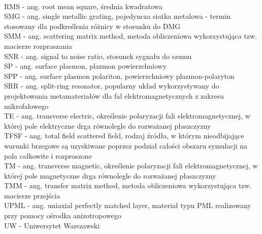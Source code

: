 \\RMS - ang. root mean square, średnia kwadratowa
\\SMG - ang. single metallic grating, pojedyncza siatka metalowa - termin stosowany dla podkreślenia różnicy w stosunku do DMG
\\SMM - ang. scattering matrix method, metoda obliczeniowa wykorzystująca tzw. macierze rozpraszania
\\SNR - ang. signal to noise ratio, stosunek sygnału do szumu
\\SP - ang. surface plasmon, plazmon powierzchniowy
\\SPP - ang. surface plasmon polariton, powierzchniowy plazmon-polaryton
\\SRR - ang. split-ring resonator, popularny układ wykorzystywany do projektowania metamateriałów dla fal elektromagnetycznych z zakresu mikrofalowego
\\TE - ang. transverse electric, określenie polaryzacji fali elektromagnetycznej, w której pole elektryczne drga równolegle do rozważanej płaszczyzny
\\TFSF - ang. total field scattered field, rodzaj źródła, w którym nieodbijające warunki brzegowe są uzyskiwane poprzez podział całości obszaru symulacji na pola całkowite i rozproszone
\\TM - ang. transverse magnetic, określenie polaryzacji fali elektromagnetycznej, w której pole magnetyczne drga równolegle do rozważanej płaszczyzny
\\TMM - ang. transfer matrix method, metoda obliczeniowa wykorzystująca tzw. macierze przejścia
\\UPML - ang.  uniaxial perfectly matched layer, materiał typu PML realizowany przy pomocy ośrodka anizotropowego
\\UW - Uniwersytet Warszawski
